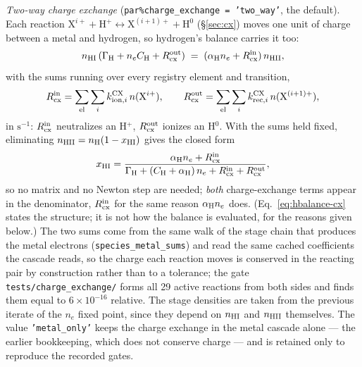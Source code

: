 \documentclass[english,a4paper]{my_memo}
\newcommand{\code}[1]{\texttt{#1}}
\newcommand{\xHI}{x_{\mathrm{HI}}}
\begin{document}
\emph{Two-way charge exchange} (\code{par\%charge\_exchange =
'two\_way'}, the default).  Each reaction
$\mathrm{X}^{i+} + \mathrm{H}^+ \leftrightarrow
\mathrm{X}^{(i+1)+} + \mathrm{H}^0$ (\S\ref{sec:cx}) moves one unit of
charge between a metal and hydrogen, so hydrogen's balance carries it too:
\begin{equation}
  n_{\rm HI}\,(\Gamma_{\rm H} + n_e C_{\rm H} + R_{\rm cx}^{\rm out})
  \;=\; (\alpha_{\rm H} n_e + R_{\rm cx}^{\rm in})\,n_{\rm HII},
  \label{eq:hcx}
\end{equation}
with the sums running over every registry element and transition,
\begin{equation}
  R_{\rm cx}^{\rm in} = \sum_{\rm el}\sum_i
    k^{\rm CX}_{{\rm ion},i}\,n(\mathrm{X}^{i+}), \qquad
  R_{\rm cx}^{\rm out} = \sum_{\rm el}\sum_i
    k^{\rm CX}_{{\rm rec},i}\,n(\mathrm{X}^{(i+1)+}),
\end{equation}
in $\mathrm{s}^{-1}$: $R_{\rm cx}^{\rm in}$ neutralizes an H$^+$,
$R_{\rm cx}^{\rm out}$ ionizes an H$^0$.  With the sums held fixed,
eliminating $n_{\rm HII} = n_{\rm H}(1-\xHI)$ gives the closed form
\begin{equation}
  \xHI = \frac{\alpha_{\rm H} n_e + R_{\rm cx}^{\rm in}}
              {\Gamma_{\rm H} + (C_{\rm H} + \alpha_{\rm H})\,n_e
               + R_{\rm cx}^{\rm in} + R_{\rm cx}^{\rm out}},
  \label{eq:hbalance-cx}
\end{equation}
so no matrix and no Newton step are needed; \emph{both} charge-exchange
terms appear in the denominator, $R_{\rm cx}^{\rm in}$ for the same reason
$\alpha_{\rm H} n_e$ does.  (Eq.~\ref{eq:hbalance-cx} states the structure;
it is not how the balance is evaluated, for the reasons given below.)  The two sums come from the same walk of the
stage chain that produces the metal electrons
(\code{species\_metal\_sums}) and read the same cached coefficients the
cascade reads, so the charge each reaction moves is conserved in the
reacting pair by construction rather than to a tolerance; the gate
\code{tests/charge\_exchange/} forms all 29 active reactions from both
sides and finds them equal to $6\times10^{-16}$ relative.  The stage
densities are taken from the previous iterate of the $n_e$ fixed point,
since they depend on $n_{\rm HI}$ and $n_{\rm HII}$ themselves.  The
value \code{'metal\_only'} keeps the charge exchange in the metal cascade
alone --- the earlier bookkeeping, which does not conserve charge --- and
is retained only to reproduce the recorded gates.
\end{document}
